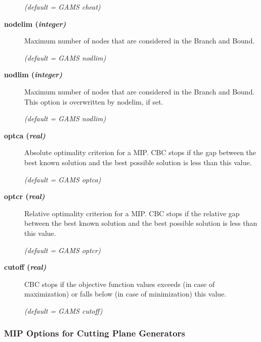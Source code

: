 \begin{description}
\textsl{(default = GAMS cheat)}

\item[\label{nodelim}\hypertarget{nodelim}
{\textbf{nodelim (\slshape{integer})}}]\hspace{1.0in}

Maximum number of nodes that are considered in the Branch and Bound.

\textsl{(default = GAMS nodlim)}

\item[\label{nodlim}\hypertarget{nodlim}
{\textbf{nodlim (\slshape{integer})}}]\hspace{1.0in}

Maximum number of nodes that are considered in the Branch and Bound.
This option is overwritten by nodelim, if set.

\textsl{(default = GAMS nodlim)}

\item[\label{optca}\hypertarget{optca}
{\textbf{optca (\slshape{real})}}]\hspace{1.0in}

Absolute optimality criterion for a MIP.
CBC stops if the gap between the best known solution and the best possible solution is less than this value.

\textsl{(default = GAMS optca)}

\item[\label{optcr}\hypertarget{optcr}
{\textbf{optcr (\slshape{real})}}]\hspace{1.0in}

Relative optimality criterion for a MIP.
CBC stops if the relative gap between the best known solution and the best possible solution is less than this value.

\textsl{(default = GAMS optcr)}

\item[\label{cutoff}\hypertarget{cutoff}
{\textbf{cutoff (\slshape{real})}}]\hspace{1.0in}

CBC stops if the objective function values exceeds (in case of maximization) or falls below (in case of minimization) this value.

\textsl{(default = GAMS cutoff)}

\end{description}

\subsubsection{MIP Options for Cutting Plane Generators}

